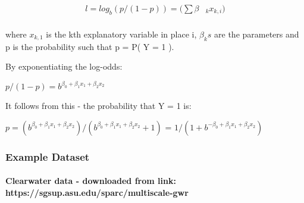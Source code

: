 \documentclass[11pt]{article}
\begin{document}
    \begin{align}
l = log_b ( p / (1-p)) = ({\sum} {\beta} & _k x _{k,i}) \\
\end{align}

where \(x_{k,1}\) is the kth explanatory variable in place i, \(𝛽_ks\)
are the parameters and p is the probability such that p = P( Y = 1 ).

By exponentiating the log-odds:

\(p / (1-p) = b^ {𝛽_0 + 𝛽_1 x_1 + 𝛽_2 x_2}\)

It follows from this - the probability that Y = 1 is:

\(p = (b^ {𝛽_0 + 𝛽_1 x_1 + 𝛽_2 x_2}) / (b^ {𝛽_0 + 𝛽_1 x_1 + 𝛽_2 x_2} + 1)\)
= \(1 / (1 + b^ {- 𝛽_0 + 𝛽_1 x_1 + 𝛽_2 x_2})\)

    \subsubsection{Example Dataset}\label{example-dataset}

    \paragraph{Clearwater data - downloaded from link:
https://sgsup.asu.edu/sparc/multiscale-gwr}\label{clearwater-data---downloaded-from-link-httpssgsup.asu.edusparcmultiscale-gwr}
\end{document}

